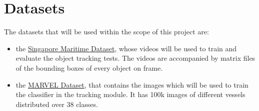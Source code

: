 \documentclass[a4paper,12pt]{article}
\begin{document}
\section{Datasets}
The datasets that will be used within the scope of this project are:
\begin{itemize}
    \item the \href{https://sites.google.com/site/dilipprasad/home/singapore-maritime-dataset}{Singapore Maritime Dataset}, whose videos will be used to train and evaluate the object tracking tests. The videos are accompanied by matrix files of the bounding boxes of every object on frame.
    \item the \href{https://github.com/avaapm/marveldataset2016}{MARVEL Dataset}, that contains the images which will be used to train the classifier in the tracking module. It has 100k images of different vessels distributed over 38 classes.
\end{itemize}
\end{document}

